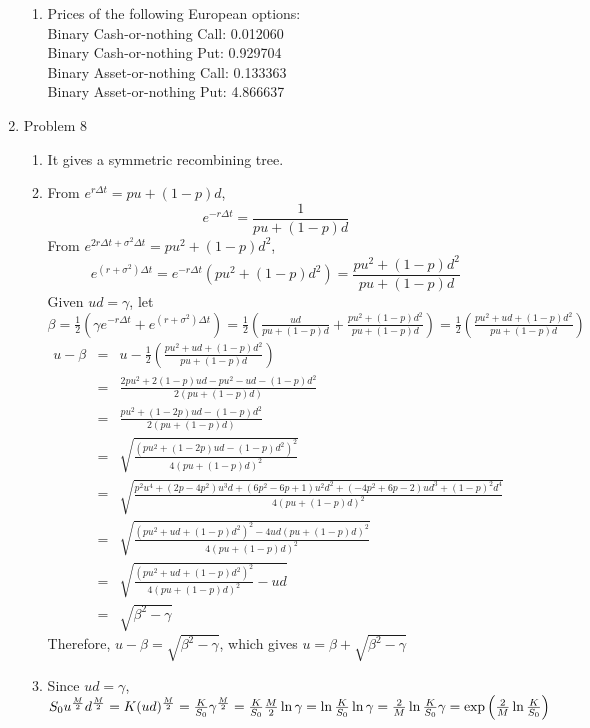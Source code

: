 \documentclass[a4paper]{article}
\def\dd{\Delta}
\def\lb{\left(}
\def\rb{\right)}
\begin{document}
\begin{enumerate}
\begin{enumerate}
\item Prices of the following European options:\\
Binary Cash-or-nothing Call: 0.012060\\
Binary Cash-or-nothing Put: 0.929704\\
Binary Asset-or-nothing Call: 0.133363\\
Binary Asset-or-nothing Put: 4.866637\\

\end{enumerate}

\pagebreak

\item Problem 8\\
\begin{enumerate}
\item It gives a symmetric recombining tree.\\

\item From $e^{r\dd t}=pu+(1-p)d$,
\[e^{-r\dd t}=\frac{1}{pu+(1-p)d}\]
From $e^{2r\dd t+\sigma^2\dd t}=pu^2+(1-p)d^2$,
\[e^{(r+\sigma^2)\dd t}=e^{-r\dd t}(pu^2+(1-p)d^2)=\frac{pu^2+(1-p)d^2}{pu+(1-p)d} \]
Given $ud=\gamma$, let $\beta=\frac{1}{2}\lb\gamma e^{-r\dd t}+e^{(r+\sigma^2)\dd t}\rb=\frac{1}{2}\lb\frac{ud}{pu+(1-p)d}+\frac{pu^2+(1-p)d^2}{pu+(1-p)d}\rb=\frac{1}{2}\lb\frac{pu^2+ud+(1-p)d^2}{pu+(1-p)d}\rb$
\begin{eqnarray*}
u-\beta&=&u-\frac{1}{2}\lb\frac{pu^2+ud+(1-p)d^2}{pu+(1-p)d}\rb\\
&=&\frac{2pu^2+2(1-p)ud-pu^2-ud-(1-p)d^2}{2(pu+(1-p)d)}\\
&=&\frac{pu^2+(1-2p)ud-(1-p)d^2}{2(pu+(1-p)d)}\\
&=&\sqrt{\frac{(pu^2+(1-2p)ud-(1-p)d^2)^2}{4(pu+(1-p)d)^2}}\\
&=&\sqrt{\frac{p^2u^4+(2p-4p^2)u^3d+(6p^2-6p+1)u^2d^2+(-4p^2+6p-2)ud^3+(1-p)^2d^4}{4(pu+(1-p)d)^2}}\\
&=&\sqrt{\frac{(pu^2+ud+(1-p)d^2)^2-4ud(pu+(1-p)d)^2}{4(pu+(1-p)d)^2}}\\
&=&\sqrt{\frac{(pu^2+ud+(1-p)d^2)^2}{4(pu+(1-p)d)^2}-ud}\\
&=&\sqrt{\beta^2-\gamma}
\end{eqnarray*}
Therefore, $u-\beta=\sqrt{\beta^2-\gamma}$, which gives $u=\beta+\sqrt{\beta^2-\gamma}$

\item Since $ud=\gamma$,\\
\begin{math}
S_0u^{\frac{M}{2}}d^{\frac{M}{2}}=K\\
(ud)^{\frac{M}{2}}=\frac{K}{S_0}\\
\gamma^{\frac{M}{2}}=\frac{K}{S_0}\\
\frac{M}{2}\ln\gamma=\ln\frac{K}{S_0}\\
\ln\gamma=\frac{2}{M}\ln\frac{K}{S_0}\\
\gamma=\exp\lb\frac{2}{M}\ln\frac{K}{S_0}\rb
\end{math}

\end{enumerate}
\end{enumerate}
\end{document}
